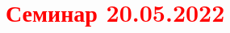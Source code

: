 \documentclass[main.tex]{subfiles}
\begin{document}
\section{\textcolor{red}{Семинар 20.05.2022}}
\end{document}
